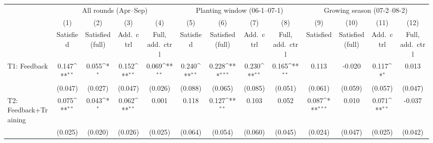 {
\def\sym#1{\ifmmode^{#1}\else\(^{#1}\)\fi}
\begin{tabular}{l*{12}{c}}
\toprule
                    &\multicolumn{4}{c}{All rounds (Apr--Sep)}                                              &\multicolumn{4}{c}{Planting window (06-1--07-1)}                                       &\multicolumn{4}{c}{Growing season (07-2--08-2)}                                        \\\cmidrule(lr){2-5}\cmidrule(lr){6-9}\cmidrule(lr){10-13}
                    &\multicolumn{1}{c}{(1)}&\multicolumn{1}{c}{(2)}&\multicolumn{1}{c}{(3)}&\multicolumn{1}{c}{(4)}&\multicolumn{1}{c}{(5)}&\multicolumn{1}{c}{(6)}&\multicolumn{1}{c}{(7)}&\multicolumn{1}{c}{(8)}&\multicolumn{1}{c}{(9)}&\multicolumn{1}{c}{(10)}&\multicolumn{1}{c}{(11)}&\multicolumn{1}{c}{(12)}\\
                    &\multicolumn{1}{c}{Satisfied}&\multicolumn{1}{c}{Satisfied (full)}&\multicolumn{1}{c}{Add.\ ctrl}&\multicolumn{1}{c}{Full, add.\ ctrl}&\multicolumn{1}{c}{Satisfied}&\multicolumn{1}{c}{Satisfied (full)}&\multicolumn{1}{c}{Add.\ ctrl}&\multicolumn{1}{c}{Full, add.\ ctrl}&\multicolumn{1}{c}{Satisfied}&\multicolumn{1}{c}{Satisfied (full)}&\multicolumn{1}{c}{Add.\ ctrl}&\multicolumn{1}{c}{Full, add.\ ctrl}\\
\midrule
T1: Feedback        &       0.147\sym{**} &       0.055\sym{*}  &       0.152\sym{**} &       0.069\sym{**} &       0.240\sym{**} &       0.228\sym{***}&       0.230\sym{**} &       0.165\sym{**} &       0.113         &      -0.020         &       0.117\sym{*}  &       0.013         \\
                    &     (0.047)         &     (0.027)         &     (0.047)         &     (0.026)         &     (0.088)         &     (0.065)         &     (0.085)         &     (0.051)         &     (0.061)         &     (0.059)         &     (0.057)         &     (0.047)         \\
T2: Feedback+Training&       0.075\sym{**} &       0.043\sym{*}  &       0.062\sym{**} &       0.001         &       0.118         &       0.127\sym{**} &       0.103         &       0.052         &       0.087\sym{***}&       0.010         &       0.071\sym{**} &      -0.037         \\
                    &     (0.025)         &     (0.020)         &     (0.026)         &     (0.025)         &     (0.064)         &     (0.054)         &     (0.060)         &     (0.045)         &     (0.024)         &     (0.047)         &     (0.025)         &     (0.042)         \\

\end{tabular}}
